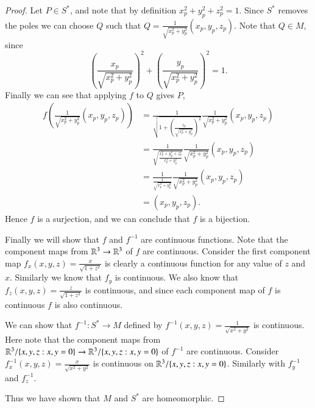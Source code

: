 \documentclass[minion]{homework651}
\begin{document}
\begin{problems}
\begin{proof}
    Let $P \in S^*$, and note that by definition $x_p^2 + y_p^2 + z_p^2 = 1$. Since $S^*$ removes the poles we can choose $Q$ such that $Q = \frac{1}{\sqrt{x_p^2 + y_p^2}}(x_p, y_p, z_p)$. Note that $Q \in M$, since 
   \begin{equation*}
    \left(\frac{x_p}{\sqrt{x_p^2 + y_p^2}}\right)^2 + \left(\frac{y_p}{\sqrt{x_p^2 + y_p^2}}\right)^2 =  1.
   \end{equation*}  
   Finally we can see that applying $f$ to $Q$ gives $P$, 
   \begin{align*}
    f\left(\frac{1}{\sqrt{x_p^2 + y_p^2}}(x_p, y_p, z_p)\right) &= \frac{1}{\sqrt{1 + \left(\frac{z_p}{\sqrt{x_p^2 + y_p^2}}\right)^2}}\frac{1}{\sqrt{x_p^2 + y_p^2}}(x_p, y_p, z_p)\\
     &= \frac{1}{\sqrt{\frac{x_p^2 + y_p^2 + z_p^2}{x_p^2 + y_p^2}}}\frac{1}{\sqrt{x_p^2 + y_p^2}}(x_p, y_p, z_p)\\
     &= \frac{1}{\frac{1}{\sqrt{x_p^2 + y_p^2}}}\frac{1}{\sqrt{x_p^2 + y_p^2}}(x_p, y_p, z_p)\\
     &= (x_p, y_p, z_p).
   \end{align*} 
   Hence $f$ is a surjection, and we can conclude that $f$ is a bijection. 
   


    Finally we will show that $f$ and $f^{-1}$ are continuous functions. Note that the component maps from $\mathbb R^3 \to \mathbb R^3$ of $f$ are continuous. Consider the first component map $f_x(x, y, z) = \frac{x}{\sqrt{1 + z^2}}$ is clearly a continuous function
    for any value of $z$ and $x$. Similarly we know that $f_y$ is continuous. We also know that $f_z(x, y, z) = \frac{z}{\sqrt{1 + z^2}}$ is continuous, and since each component map of $f$
    is continuous $f$ is also continuous.  

    We can show that $f^{-1}: S^* \to M$ defined by $f^{-1}(x, y ,z) = \frac{1}{\sqrt{x^2 + y^2}}$ is continuous. Here note that the component maps from $\mathbb R^3 /\{x, y, z: x, y = 0\} \to \mathbb R^3 /\{x, y, z: x, y = 0\}$
    of $f^{-1}$ are continuous. Consider $f_x^{-1}(x, y ,z) = \frac{x}{\sqrt{x^2 + y^2}}$ is continuous on $\mathbb R^3 /\{x, y, z: x, y = 0\}$. Similarly with $f_y^{-1}$ and $f_z^{-1}$.

    Thus we have shown that $M$ and $S^*$ are homeomorphic. 
    
\end{proof}


\end{problems}
\end{document}
